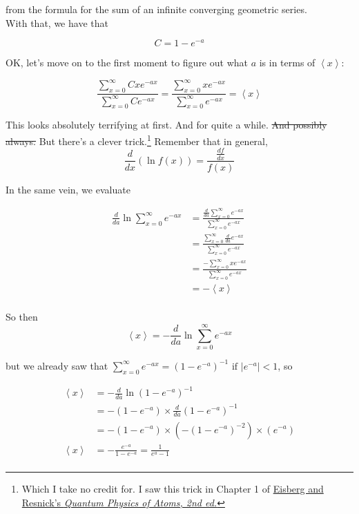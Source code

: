 \documentclass[letterpaper,12pt]{report}
\begin{document}
from the formula for the sum of an infinite converging geometric series.
\\
With that, we have that

\[ C = 1 - e^{-a} \]

OK, let's move on to the first moment to figure out what \(a\) is in terms of \(\left<x\right>\):

\[
\frac{\sum_{x=0}^{\infty} Cxe^{-ax}} {\sum_{x=0}^{\infty} Ce^{-ax}} 
= \frac{\sum_{x=0}^{\infty} xe^{-ax}} {\sum_{x=0}^{\infty} e^{-ax}}
= \left<x\right>
\]

This looks absolutely terrifying at first. And for quite a while. \sout{And possibly always.}
But there's a clever trick.\footnote
{
  Which I take no credit for. I saw this trick in Chapter 1 of
  \href{http://www.sicyon.com/resources/library/pdf/eisberg_resnick-quantum_physics.pdf}
  {Eisberg and Resnick's \textit{Quantum Physics of Atoms, 2nd ed.}}
}
Remember that in general,
\[\frac{d}{dx}\left(\ln{f(x)}\right) = \frac{\frac{df}{dx}}{f(x)}\]

In the same vein, we evaluate

\[\begin{split}
  \frac{d}{da}\ln{\sum_{x=0}^{\infty} e^{-ax}} &=
  \frac{\frac{d}{da}\sum_{x=0}^{\infty} e^{-ax}} {\sum_{x=0}^{\infty} e^{-ax}} \\
  &= \frac{\sum_{x=0}^{\infty}\frac{d}{da} e^{-ax}} {\sum_{x=0}^{\infty} e^{-ax}} \\
      &= \frac{-\sum_{x=0}^{\infty}xe^{-ax}} {\sum_{x=0}^{\infty} e^{-ax}} \\
      &= -\left<x\right> \\
\end{split}
\]

So then
\[
  \left<x\right> = -\frac{d}{da}\ln{\sum_{x=0}^{\infty} e^{-ax}}
\]

but we already saw that
\(\sum_{x=0}^{\infty} e^{-ax} = (1 - e^{-a})^{-1} \text{ if } \left|e^{-a}\right| < 1 \), so 

\[\begin{split}
  \left<x\right> &= -\frac{d}{da}\ln{\left(1 - e^{-a}\right)^{-1}} \\
      &= -\left(1 - e^{-a}\right) \times \frac{d}{da}\left(1 - e^{-a}\right)^{-1} \\
      &= -\left(1 - e^{-a}\right) \times \left(-\left(1 - e^{-a}\right)^{-2}\right) 
      \times \left(e^{-a}\right) \\ 
  \left<x\right> &= -\frac{e^{-a}}{1 - e^{-a}} = \frac{1}{e^a - 1} \\
\end{split}
\]
\end{document}
